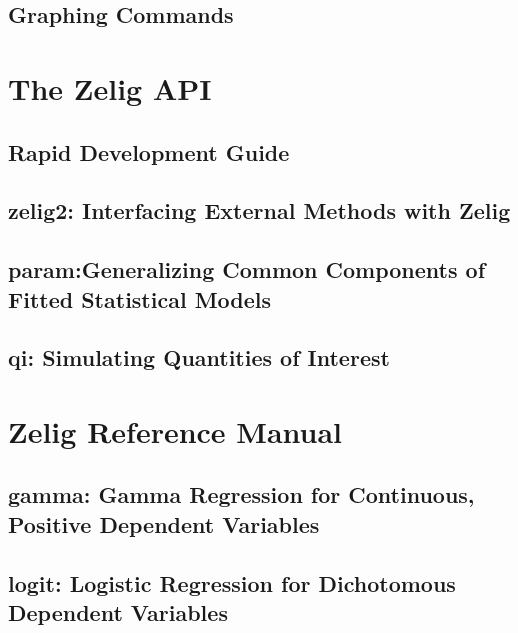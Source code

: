 \documentclass{book}
\begin{document}
\chapter[Graphing Commands]{Graphing Commands}
\label{chapter:Graphs}


\part{The Zelig API}
\label{part:The Zelig API}

\chapter[Development Guide]{Rapid Development Guide}
\label{chapter:Quickstart}


\chapter[zelig2]{zelig2: Interfacing External Methods with Zelig}
\label{chapter:Zelig2}


\chapter[param]{param:Generalizing Common Components of Fitted Statistical Models}
\label{chapter:Parameters}


\chapter[qi]{qi: Simulating Quantities of Interest}
\label{chapter:Qi}


\part{Zelig Reference Manual}
\label{part:Zelig Reference Manual}

\chapter[gamma]{gamma: Gamma Regression for Continuous, Positive Dependent Variables}
\label{chapter:Gamma}


\chapter[logit]{logit: Logistic Regression for Dichotomous Dependent Variables}
\label{chapter:Logit}

\end{document}
